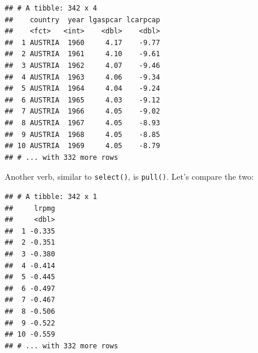 \documentclass[]{gitbook}
\newenvironment{Shaded}{\begin{snugshade}}{\end{snugshade}}
\newcommand{\KeywordTok}[1]{\textcolor[rgb]{0.13,0.29,0.53}{\textbf{#1}}}
\newcommand{\NormalTok}[1]{#1}
\newcommand{\OperatorTok}[1]{\textcolor[rgb]{0.81,0.36,0.00}{\textbf{#1}}}
\newcommand{\StringTok}[1]{\textcolor[rgb]{0.31,0.60,0.02}{#1}}
\begin{document}
\begin{verbatim}
## # A tibble: 342 x 4
##    country  year lgaspcar lcarpcap
##    <fct>   <int>    <dbl>    <dbl>
##  1 AUSTRIA  1960     4.17    -9.77
##  2 AUSTRIA  1961     4.10    -9.61
##  3 AUSTRIA  1962     4.07    -9.46
##  4 AUSTRIA  1963     4.06    -9.34
##  5 AUSTRIA  1964     4.04    -9.24
##  6 AUSTRIA  1965     4.03    -9.12
##  7 AUSTRIA  1966     4.05    -9.02
##  8 AUSTRIA  1967     4.05    -8.93
##  9 AUSTRIA  1968     4.05    -8.85
## 10 AUSTRIA  1969     4.05    -8.79
## # ... with 332 more rows
\end{verbatim}

Another verb, similar to \texttt{select()}, is \texttt{pull()}. Let's compare the two:

\begin{Shaded}
\end{Shaded}

\begin{verbatim}
## # A tibble: 342 x 1
##     lrpmg
##     <dbl>
##  1 -0.335
##  2 -0.351
##  3 -0.380
##  4 -0.414
##  5 -0.445
##  6 -0.497
##  7 -0.467
##  8 -0.506
##  9 -0.522
## 10 -0.559
## # ... with 332 more rows
\end{verbatim}

\begin{Shaded}
\end{Shaded}
\end{document}
